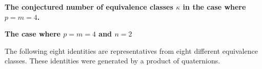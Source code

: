 \documentclass[12pt]{article}
\numberwithin{equation}{section}
\newcommand{\MySectionSpacing}{15}
\newcommand{\MySectionFontSize}{40}
\begin{document}
\begin{landscape}
{{\begin{table}[h]
\begin{center}
\end{center}
\caption{
\bf The conjectured number of equivalence
classes \( \kappa \)  
in the case where \(p = m = 4\).
 }

\end{table}



\newpage

\noindent
\begin{center}
{\fontsize{\MySectionFontSize}{\MySectionSpacing}\selectfont \textbf
 {The case where \(p = m = 4\) and \(n = 2\)}
}
\end{center}








The following eight identities are representatives from 
eight different equivalence classes. These identities
were generated by a product of quaternions. 

}}
\end{landscape}
\end{document}

